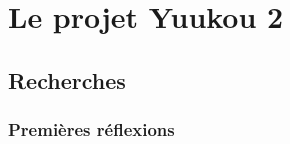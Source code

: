 \chapter{Le projet Yuukou 2}

\section{Recherches}

\subsection{Premi\`eres r\'eflexions}



\clearpage
